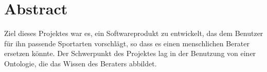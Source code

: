 \chapter{Abstract}


Ziel dieses Projektes war es, ein Softwareprodukt zu entwickelt, das dem Benutzer für ihn passende Sportarten vorschlägt, so dass es einen menschlichen Berater ersetzen könnte. Der Schwerpunkt des Projektes lag in der Benutzung von einer Ontologie, die das Wissen des Beraters abbildet.